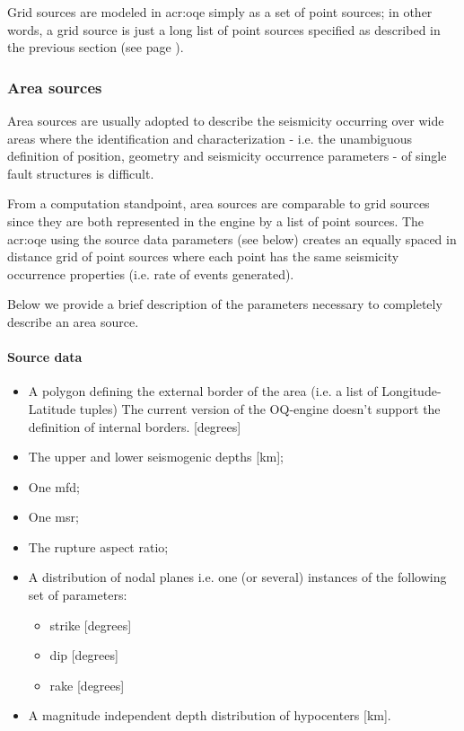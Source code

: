 Grid sources are modeled in \gls{acr:oqe} simply as a set of point sources;
in other words, a grid source is just a long list of point sources specified 
as described in the previous section (see page 
\pageref{hazard:seismic_source_types:gridSources}).
\subsubsection{Area sources}
\label{hazard:seismic_source_types:areaSources}
%
Area sources are usually adopted to describe the seismicity occurring over 
wide areas where  
the identification and characterization - i.e. the unambiguous definition 
of position, geometry and seismicity occurrence parameters - of single 
fault structures is difficult. 

From a computation standpoint, area sources are comparable to grid sources
since they are both represented in the engine by a list of point sources.
%
The \gls{acr:oqe} using the source data parameters (see below)  
creates an equally spaced in distance grid of point sources where
each point has the same seismicity occurrence properties (i.e. rate
of events generated).

Below we provide a brief description of the parameters necessary to 
completely describe an area source.
%
\paragraph{Source data}
\begin{itemize}
\item A polygon defining the external border of the area (i.e. a list of 
Longitude-Latitude tuples) The current version of the OQ-engine doesn't 
support the definition of internal borders.  [degrees]
\item The upper and lower seismogenic depths [km];
\item One \gls{mfd};
\item One \gls{msr};
\item The rupture aspect ratio;
\item A distribution of nodal planes i.e. one (or several) instances 
    of the following set of parameters:
\begin{itemize}
    \item \gls{strike} [degrees]
    \item \gls{dip} [degrees]
    \item \gls{rake} [degrees]
\end{itemize}
\item A magnitude independent depth distribution of hypocenters [km].
\end{itemize}

